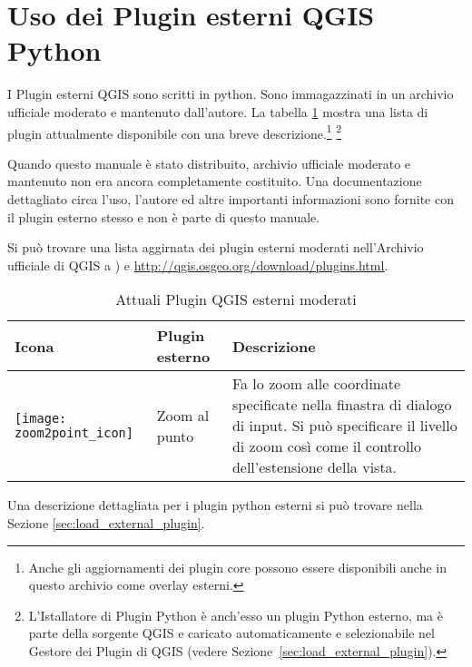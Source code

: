
\section{Uso dei Plugin esterni QGIS Python}\label{sec:external_plugins}


I Plugin esterni QGIS sono scritti in python. Sono immagazzinati in un archivio ufficiale moderato e mantenuto dall'autore. La tabella \ref{tab:external_plugins} mostra una lista di plugin attualmente disponibile con una breve descrizione.\footnote{Anche gli aggiornamenti dei plugin core possono essere disponibili anche in questo archivio come overlay esterni.} 
\footnote{L'Istallatore di Plugin Python è anch'esso un plugin Python esterno, ma è parte della sorgente QGIS e caricato automaticamente e selezionabile nel Gestore dei Plugin di QGIS (vedere Sezione~\ref{sec:load_external_plugin}).}

Quando questo manuale è stato distribuito, archivio ufficiale moderato e mantenuto non era ancora completamente costituito. Una documentazione dettagliato circa l'uso, l'autore ed altre importanti informazioni sono fornite con il plugin esterno stesso e non è parte di questo manuale.

Si può trovare una lista aggirnata dei plugin esterni moderati nell'Archivio ufficiale di QGIS a ) e \url{http://qgis.osgeo.org/download/plugins.html}. 

\begin{table}[H]
\centering
\caption{Attuali Plugin QGIS esterni moderati}\label{tab:external_plugins}\medskip
\small
 \begin{tabular}{|l|l|p{4in}|}
\hline \textbf{Icona} & \textbf{Plugin esterno} & \textbf{Descrizione}\\
\hline
\texttt{[image: zoom2point\_icon]}
 & Zoom al punto \index{plugins!Zoom To Point} & Fa lo zoom alle coordinate specificate nella finastra di dialogo di input. Si può specificare il livello di zoom così come il controllo dell'estensione della vista.\\
\hline
\end{tabular}
\end{table}

Una descrizione dettagliata per i plugin python esterni si può trovare nella 
Sezione \ref{sec:load_external_plugin}.

